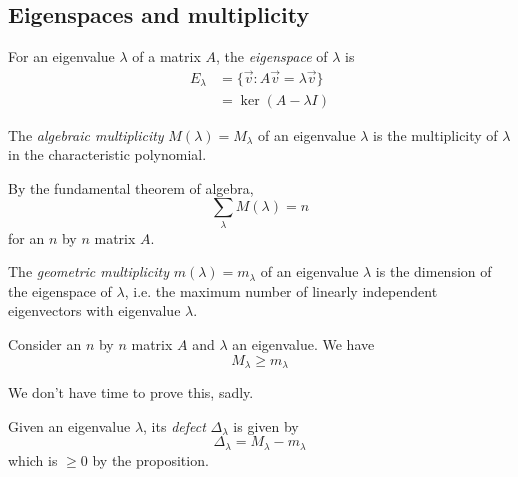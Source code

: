 \documentclass{../template/note}
\begin{document}
    \subsection{Eigenspaces and multiplicity}

    \begin{definition}
        For an eigenvalue \(\lambda\) of a matrix \(A\), the \emph{eigenspace} of \(\lambda\) is
        \begin{align*}
            E_\lambda &= \{\vec v : A \vec v = \lambda \vec v\} \\
            &= \ker(A - \lambda I)
        \end{align*}
    \end{definition}
    
    \begin{definition}
        The \emph{algebraic multiplicity} \(M(\lambda) = M_\lambda\) of an eigenvalue \(\lambda\) is the multiplicity of \(\lambda\) in the characteristic polynomial.
    \end{definition}
    
    \begin{remark*}
        By the fundamental theorem of algebra,
        \[
            \sum_\lambda M(\lambda) = n
        \]
        for an \(n\) by \(n\) matrix \(A\).
    \end{remark*}
    
    \begin{definition}
        The \emph{geometric multiplicity} \(m(\lambda) = m_\lambda\) of an eigenvalue \(\lambda\) is the dimension of the eigenspace of \(\lambda\), i.e. the maximum number of linearly independent eigenvectors with eigenvalue \(\lambda\).
    \end{definition}
    
    \begin{proposition}
        Consider an \(n\) by \(n\) matrix \(A\) and \(\lambda\) an eigenvalue. We have
        \[
            M_\lambda \geq m_\lambda
        \]
        \label{geometric-algebraic-multiplicity}
    \end{proposition}
    We don't have time to prove this, sadly.
    
    \begin{definition}
        Given an eigenvalue \(\lambda\), its \emph{defect} \(\Delta_\lambda\) is given by
        \[
            \Delta_\lambda = M_\lambda - m_\lambda
        \]
        which is \(\geq 0\) by the proposition.
    \end{definition}
    
\end{document}
